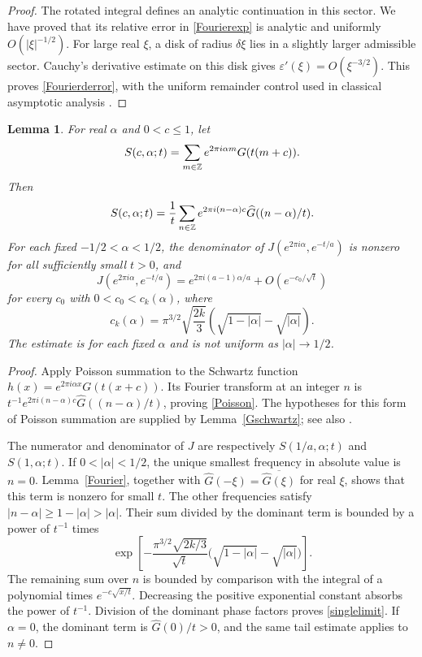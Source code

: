 \documentclass[11pt]{amsart}
\newtheorem{lemma}[theorem]{Lemma}
\theoremstyle{definition}
\theoremstyle{remark}
\numberwithin{equation}{section}
\begin{document}
\begin{proof}
The rotated integral defines an analytic continuation in this sector. We have proved that its relative error in \eqref{Fourierexp} is analytic and uniformly $O(|\xi|^{-1/2})$. For large real $\xi$, a disk of radius $\delta\xi$ lies in a slightly larger admissible sector. Cauchy's derivative estimate on this disk gives $\varepsilon'(\xi)=O(\xi^{-3/2})$. This proves \eqref{Fourierderror}, with the uniform remainder control used in classical asymptotic analysis \cite{Olver,Wong}.
\end{proof}

\begin{lemma}\label{twists}
For real $\alpha$ and $0<c\le1$, let
\[
 S(c,\alpha;t)=\sum_{m\in\mathbb Z}e^{2\pi i\alpha m}G(t(m+c)).
\]
Then
\begin{equation}\label{Poisson}
 S(c,\alpha;t)=\frac1t\sum_{n\in\mathbb Z}
 e^{2\pi i(n-\alpha)c}\widehat G((n-\alpha)/t).
\end{equation}
For each fixed $-1/2<\alpha<1/2$, the denominator of $J(e^{2\pi i\alpha},e^{-t/a})$ is nonzero for all sufficiently small $t>0$, and
\begin{equation}\label{singlelimit}
 J(e^{2\pi i\alpha},e^{-t/a})
 =e^{2\pi i(a-1)\alpha/a}+O(e^{-c_0/\sqrt t})
\end{equation}
for every $c_0$ with $0<c_0<c_k(\alpha)$, where
\begin{equation}\label{twistgap}
 c_k(\alpha)=\pi^{3/2}\sqrt{\frac{2k}{3}}
       \left(\sqrt{1-|\alpha|}-\sqrt{|\alpha|}\right).
\end{equation}
The estimate is for each fixed $\alpha$ and is not uniform as $|\alpha|\to1/2$.
\end{lemma}
\begin{proof}
Apply Poisson summation to the Schwartz function
$h(x)=e^{2\pi i\alpha x}G(t(x+c))$. Its Fourier transform at an integer $n$ is
$t^{-1}e^{2\pi i(n-\alpha)c}\widehat G((n-\alpha)/t)$, proving \eqref{Poisson}. The hypotheses for this form of Poisson summation are supplied by Lemma~\ref{Gschwartz}; see also \cite{SteinShakarchi}.

The numerator and denominator of $J$ are respectively $S(1/a,\alpha;t)$ and $S(1,\alpha;t)$. If $0<|\alpha|<1/2$, the unique smallest frequency in absolute value is $n=0$. Lemma~\ref{Fourier}, together with $\widehat G(-\xi)=\overline{\widehat G(\xi)}$ for real $\xi$, shows that this term is nonzero for small $t$. The other frequencies satisfy $|n-\alpha|\ge1-|\alpha|>|\alpha|$. Their sum divided by the dominant term is bounded by a power of $t^{-1}$ times
\[
 \exp\!\left[-\frac{\pi^{3/2}\sqrt{2k/3}}{\sqrt t}
             \bigl(\sqrt{1-|\alpha|}-\sqrt{|\alpha|}\bigr)\right].
\]
The remaining sum over $n$ is bounded by comparison with the integral of a polynomial times $e^{-c\sqrt{x/t}}$. Decreasing the positive exponential constant absorbs the power of $t^{-1}$. Division of the dominant phase factors proves \eqref{singlelimit}. If $\alpha=0$, the dominant term is $\widehat G(0)/t>0$, and the same tail estimate applies to $n\ne0$.
\end{proof}
\end{document}
